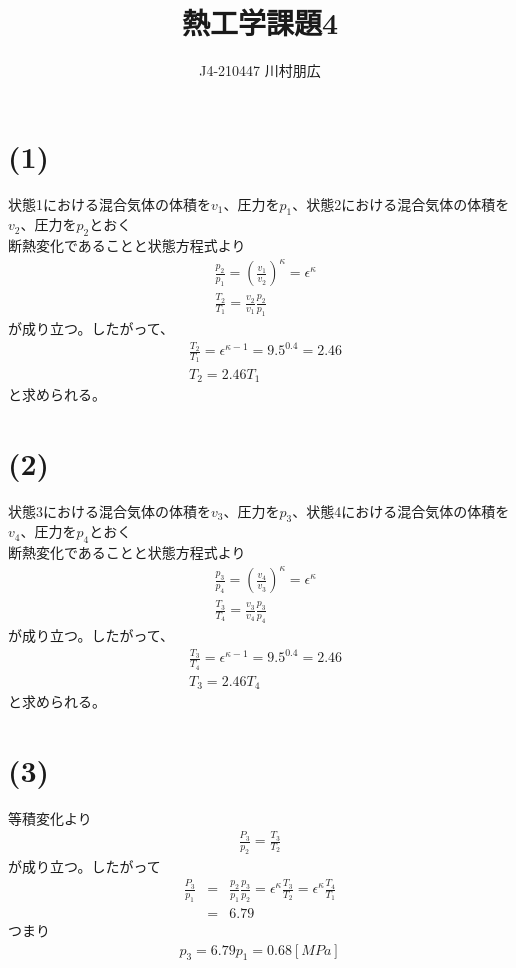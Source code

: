 \documentclass[pdflatex,ja=standard,fleqn]{bxjsarticle}
\title{熱工学課題4}
\author{J4-210447 川村朋広}
\begin{document}
\maketitle

\section*{(1)}
状態1における混合気体の体積を$v_{1}$、圧力を$p_{1}$、状態2における混合気体の体積を$v_{2}$、圧力を$p_{2}$とおく\\
断熱変化であることと状態方程式より
\begin{align*}
    &\frac{p_{2}}{p_{1}}=\left(\frac{v_{1}}{v_{2}}\right)^{\kappa}=\epsilon^{\kappa}\\
    &\frac{T_{2}}{T_{1}}=\frac{v_{2}}{v_{1}}\frac{p_{2}}{p_{1}}
\end{align*}
が成り立つ。したがって、
\begin{align*}
    &\frac{T_{2}}{T_{1}}=\epsilon^{\kappa-1}=9.5^{0.4}=2.46\\
    &T_{2}=2.46T_{1}
\end{align*}
と求められる。
\section*{(2)}
状態3における混合気体の体積を$v_{3}$、圧力を$p_{3}$、状態4における混合気体の体積を$v_{4}$、圧力を$p_{4}$とおく\\
断熱変化であることと状態方程式より
\begin{align*}
    &\frac{p_{3}}{p_{4}}=\left(\frac{v_{4}}{v_{3}}\right)^{\kappa}=\epsilon^{\kappa}\\
    &\frac{T_{3}}{T_{4}}=\frac{v_{3}}{v_{4}}\frac{p_{3}}{p_{4}}
\end{align*}
が成り立つ。したがって、
\begin{align*}
    &\frac{T_{3}}{T_{4}}=\epsilon^{\kappa-1}=9.5^{0.4}=2.46\\
    &T_{3}=2.46T_{4}
\end{align*}
と求められる。
\section*{(3)}
等積変化より
\begin{eqnarray*}
    \frac{P_{3}}{p_{2}}=\frac{T_{3}}{T_{2}}
\end{eqnarray*}
が成り立つ。したがって
\begin{eqnarray*}
    \frac{P_{3}}{p_{1}}&=&\frac{p_{2}}{p_{1}}\frac{p_{3}}{p_{2}}
    =\epsilon^{\kappa}\frac{T_{3}}{T_{2}}
    =\epsilon^{\kappa}\frac{T_{4}}{T_{1}}\\
    &=&6.79
\end{eqnarray*}
つまり
\begin{eqnarray*}
    p_{3}=6.79p_{1}=0.68[MPa]
\end{eqnarray*}
\end{document}

